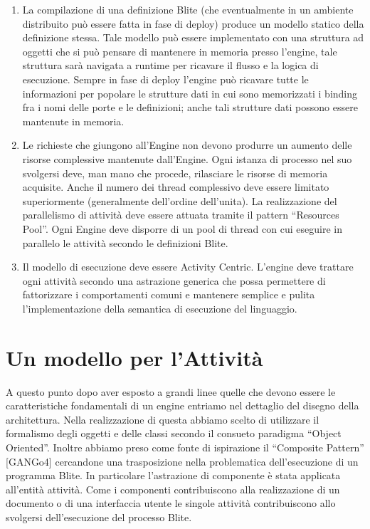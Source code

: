 \begin{enumerate}
  \item La compilazione di una definizione Blite (che eventualmente in un
  ambiente distribuito può essere fatta in fase di deploy) produce un modello
  statico della definizione stessa. Tale modello può essere implementato con una
  struttura ad oggetti che si può pensare di mantenere in memoria presso
  l'engine, tale struttura sarà navigata a runtime per ricavare il
  flusso e la logica di esecuzione. Sempre in fase di deploy l'engine può
  ricavare tutte le informazioni per popolare le strutture dati in cui sono 
  memorizzati i binding fra i nomi delle porte e le definizioni; anche tali
  strutture dati possono essere mantenute in memoria.
  
  \item Le richieste che giungono all'Engine non devono produrre un aumento
  delle risorse complessive mantenute dall'Engine. Ogni istanza di processo nel
  suo svolgersi deve, man mano che procede, rilasciare le risorse di memoria
  acquisite. Anche il numero dei thread complessivo deve essere limitato
  superiormente (generalmente dell'ordine dell'unita). La realizzazione del
  parallelismo di attività deve essere attuata tramite il pattern ``Resources
  Pool''. Ogni Engine deve disporre di un pool di thread con cui eseguire in
  parallelo le attività secondo le definizioni Blite.
  
  \item Il modello di esecuzione deve essere Activity Centric. L'engine deve
  trattare ogni attività secondo una astrazione generica che possa permettere di
  fattorizzare i comportamenti comuni e mantenere semplice e pulita
  l'implementazione della semantica di esecuzione del linguaggio.
\end{enumerate}

\section{Un modello per l'Attività}
A questo punto dopo aver esposto a grandi linee quelle che devono essere le
caratteristiche fondamentali di un engine entriamo nel dettaglio del disegno
della architettura. Nella realizzazione di questa abbiamo scelto di utilizzare
il formalismo degli oggetti e delle classi secondo il consueto paradigma
``Object Oriented''. Inoltre abbiamo preso come fonte di
ispirazione il ``Composite Pattern'' [GANGo4] cercandone una trasposizione nella
problematica dell'esecuzione di un programma Blite. In particolare
l'astrazione di componente \`e stata applicata all'entità attività. Come i
componenti contribuiscono alla realizzazione di un documento o di una
interfaccia utente le singole attività contribuiscono allo svolgersi
dell'esecuzione del processo Blite.
 
